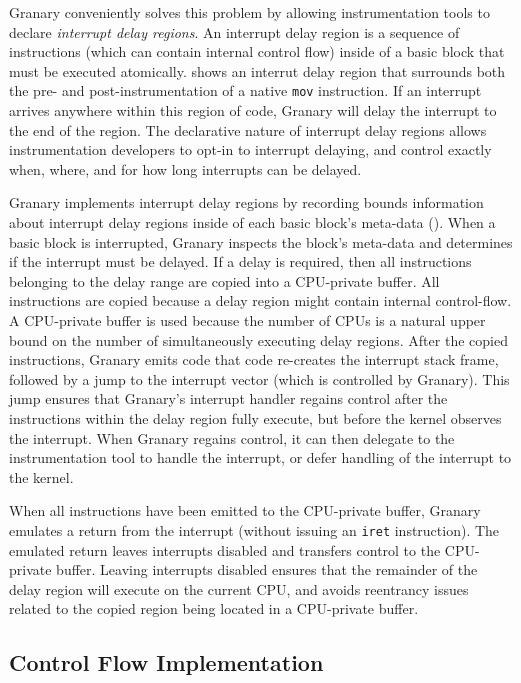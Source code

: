 \documentclass[preprint]{sigplanconf}
\begin{document}
Granary conveniently solves this problem by allowing instrumentation tools to declare \emph{interrupt delay regions}. An interrupt delay region is a sequence of instructions (which can contain internal control flow) inside of a basic block that must be executed atomically.  shows an interrut delay region that surrounds both the pre- and post-instrumentation of a native \texttt{mov} instruction. If an interrupt arrives anywhere within this region of code, Granary will delay the interrupt to the end of the region. The declarative nature of interrupt delay regions allows instrumentation developers to opt-in to interrupt delaying, and control exactly when, where, and for how long interrupts can be delayed.

Granary implements interrupt delay regions by recording bounds information about interrupt delay regions inside of each basic block's meta-data (). When a basic block is interrupted, Granary inspects the block's meta-data and determines if the interrupt must be delayed. If a delay is required, then all instructions belonging to the delay range are copied into a CPU-private buffer. All instructions are copied because a delay region might contain internal control-flow. A CPU-private buffer is used because the number of CPUs is a natural upper bound on the number of simultaneously executing delay regions. After the copied instructions, Granary emits code that code re-creates the interrupt stack frame, followed by a jump to the interrupt vector (which is controlled by Granary). This jump ensures that Granary's interrupt handler regains control after the instructions within the delay region fully execute, but before the kernel observes the interrupt. When Granary regains control, it can then delegate to the instrumentation tool to handle the interrupt, or defer handling of the interrupt to the kernel.

When all instructions have been emitted to the CPU-private buffer, Granary emulates a return from the interrupt (without issuing an \texttt{iret} instruction). The emulated return leaves interrupts disabled and transfers control to the CPU-private buffer. Leaving interrupts disabled ensures that the remainder of the delay region will execute on the current CPU, and avoids reentrancy issues related to the copied region being located in a CPU-private buffer.

\subsection{Control Flow Implementation}
\end{document}
